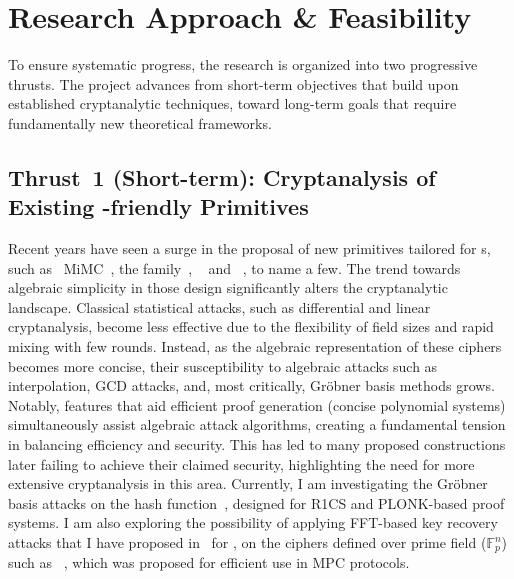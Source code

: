 	\section{Research Approach \& Feasibility}
	To ensure systematic progress, the research is organized into two progressive thrusts.
	The project advances from short-term objectives that build upon established cryptanalytic techniques, toward long-term goals that require fundamentally new theoretical frameworks.
	
	\subsection{Thrust~1 (Short-term): Cryptanalysis of Existing -friendly Primitives}
	Recent years have seen a surge in the proposal of new primitives tailored for s, such as \cx~{MiMC}~\cite{DBLP:conf/asiacrypt/Albrecht0R0T16}, the  family~\cite{DBLP:journals/tosc/AlyABDS20}, ~\cite{DBLP:conf/uss/0001KR0S21} and ~\cite{DBLP:journals/iacr/HaHLPS25}, to name a few.
	The trend towards algebraic simplicity in those design significantly alters the cryptanalytic landscape.
	Classical statistical attacks, such as differential and linear cryptanalysis, become less effective due to the flexibility of field sizes and rapid mixing with few rounds.
	Instead, as the algebraic representation of these ciphers becomes more concise, their susceptibility to algebraic attacks such as interpolation, GCD attacks, and, most critically, Gröbner basis methods grows.
	Notably, features that aid efficient proof generation (concise polynomial systems) simultaneously assist algebraic attack algorithms, creating a fundamental tension in balancing efficiency and security.
	This has led to many proposed constructions later failing to achieve their claimed security, highlighting the need for more extensive cryptanalysis in this area.
	Currently, I am investigating the Gr\"obner basis attacks on the  hash function~\cite{DBLP:journals/iacr/HaHLPS25}, designed for R1CS and PLONK-based proof systems.
	I am also exploring the possibility of applying FFT-based key recovery attacks that I have proposed in~\cite{DBLP:conf/eurocrypt/DunkelmanGKLMM24} for , on the ciphers defined over prime field ($\mathbb{F}_p^n$) such as ~\cite{DBLP:conf/eurocrypt/MasureMMS23}, which was proposed for efficient use in MPC protocols.
	
